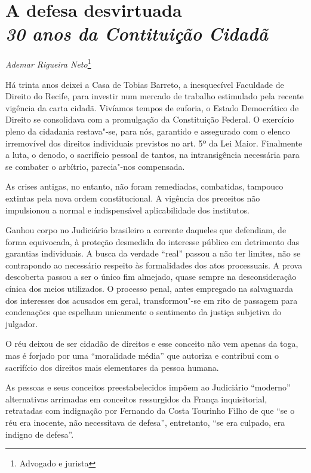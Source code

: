 \chapter*{A defesa desvirtuada\\
\emph{30 anos da Contituição Cidadã}}


\begin{flushright}
\emph{Ademar Rigueira Neto}\footnote{Advogado e jurista}
\end{flushright}

Há trinta anos deixei a Casa de Tobias Barreto, a inesquecível Faculdade
de Direito do Recife, para investir num mercado de trabalho estimulado
pela recente vigência da carta cidadã. Vivíamos tempos de euforia, o
Estado Democrático de Direito se consolidava com a promulgação da
Constituição Federal. O exercício pleno da cidadania restava"-se, para
nós, garantido e assegurado com o elenco irremovível dos direitos
individuais previstos no art. 5º da Lei Maior. Finalmente a luta, o
denodo, o sacrifício pessoal de tantos, na intransigência necessária
para se combater o arbítrio, parecia"-nos compensada.

As crises antigas, no entanto, não foram remediadas, combatidas,
tampouco extintas pela nova ordem constitucional. A vigência dos
preceitos não impulsionou a normal e indispensável aplicabilidade dos
institutos.

Ganhou corpo no Judiciário brasileiro a corrente daqueles que defendiam,
de forma equivocada, à proteção desmedida do interesse público em
detrimento das garantias individuais. A busca da verdade ``real'' passou
a não ter limites, não se contrapondo ao necessário respeito às
formalidades dos atos processuais. A prova descoberta passou a ser o
único fim almejado, quase sempre na desconsideração cínica dos meios
utilizados. O processo penal, antes empregado na salvaguarda dos
interesses dos acusados em geral, transformou"-se em rito de passagem
para condenações que espelham unicamente o sentimento da justiça
subjetiva do julgador.

O réu deixou de ser cidadão de direitos e esse conceito não vem apenas
da toga, mas é forjado por uma ``moralidade média'' que autoriza e
contribui com o sacrifício dos direitos mais elementares da pessoa
humana.

As pessoas e seus conceitos preestabelecidos impõem ao Judiciário
``moderno'' alternativas arrimadas em conceitos ressurgidos da França
inquisitorial, retratadas com indignação por Fernando da Costa Tourinho
Filho de que ``se o réu era inocente, não necessitava de defesa'',
entretanto, ``se era culpado, era indigno de defesa''.

